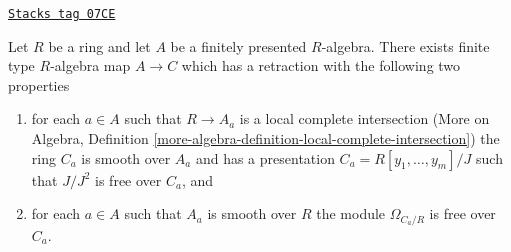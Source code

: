 \begin{lemma}
\label{smoothing-lemma-improve-presentation}
\href{https://stacks.math.columbia.edu/tag/07CE}{\texttt{Stacks tag 07CE}}

Let $R$ be a ring and let $A$ be a finitely presented $R$-algebra.
There exists finite type $R$-algebra map $A \to C$ which has a
retraction with the following two properties
\begin{enumerate}
\item for each $a \in A$ such that $R \to A_a$ is a local complete
intersection (More on Algebra, Definition
\ref{more-algebra-definition-local-complete-intersection})
the ring $C_a$ is smooth over $A_a$ and has a presentation
$C_a = R[y_1, \ldots, y_m]/J$ such that $J/J^2$ is free over $C_a$, and
\item for each $a \in A$ such that $A_a$ is smooth over $R$ the
module $\Omega_{C_a/R}$ is free over $C_a$.
\end{enumerate}
\end{lemma}

